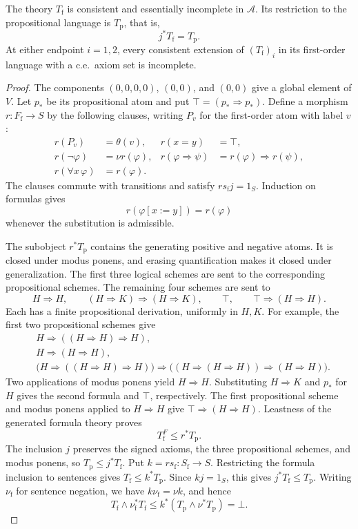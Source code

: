 \begin{proposition}\label{prop:fork-first-order-conservative}
The theory $T_{\mathrm f}$ is consistent and essentially
incomplete in $\mathcal A$. Its restriction to the propositional
language is $T_{\mathrm p}$, that is,
\[
 j^*T_{\mathrm f}=T_{\mathrm p}.
\]
At either endpoint $i=1,2$, every consistent extension of
$(T_{\mathrm f})_i$ in its first-order language with a c.e.\ axiom set
is incomplete.
\end{proposition}
\begin{proof}
The components
$(0,0,0,0)$, $(0,0)$, and $(0,0)$ give a global element of $V$.
Let $p_*$ be its propositional atom and put
$\top=(p_*\Rightarrow p_*)$. Define a morphism
$r:F_{\mathrm f}\to S$ by the following clauses, writing $P_v$
for the first-order atom with label $v$:
\[
\begin{aligned}
 r(P_v)&=\theta(v),& r(x=y)&=\top,\\
 r(\neg\varphi)&=\nu r(\varphi),&
 r(\varphi\Rightarrow\psi)&=r(\varphi)\Rightarrow r(\psi),\\
 r(\forall x\,\varphi)&=r(\varphi).
\end{aligned}
\]
The clauses commute with transitions and satisfy
$r s_{\mathrm f}j=1_S$. Induction on formulas gives
\[
 r(\varphi[x:=y])=r(\varphi)
\]
whenever the substitution is admissible.

The subobject $r^*T_{\mathrm p}$ contains the generating positive
and negative atoms. It is closed under modus ponens, and erasing
quantification makes it closed under generalization. The first
three logical schemes are sent to the corresponding
propositional schemes. The remaining four schemes are sent to
\[
 H\Rightarrow H,\qquad
 (H\Rightarrow K)\Rightarrow(H\Rightarrow K),\qquad
 \top,\qquad
 \top\Rightarrow(H\Rightarrow H).
\]
Each has a finite propositional derivation, uniformly in $H,K$.
For example, the first two propositional schemes give
\[
\begin{aligned}
 &H\Rightarrow((H\Rightarrow H)\Rightarrow H),\\
 &H\Rightarrow(H\Rightarrow H),\\
 &\bigl(H\Rightarrow((H\Rightarrow H)\Rightarrow H)\bigr)
   \Rightarrow
   \bigl((H\Rightarrow(H\Rightarrow H))
                   \Rightarrow(H\Rightarrow H)\bigr).
\end{aligned}
\]
Two applications of modus ponens yield $H\Rightarrow H$.
Substituting $H\Rightarrow K$ and $p_*$ for $H$ gives the second
formula and $\top$, respectively. The first
propositional scheme and modus ponens applied to $H\Rightarrow H$ give
$\top\Rightarrow(H\Rightarrow H)$.
Leastness of the generated formula theory proves
\[
 T_{\mathrm f}^F\le r^*T_{\mathrm p}.
\]
The inclusion $j$ preserves the signed axioms, the three propositional
schemes, and modus ponens, so $T_{\mathrm p}\le j^*T_{\mathrm f}$.
Put $k=r s_{\mathrm f}:S_{\mathrm f}\to S$. Restricting the formula
inclusion to sentences gives $T_{\mathrm f}\le k^*T_{\mathrm p}$.
Since $kj=1_S$, this gives $j^*T_{\mathrm f}\le T_{\mathrm p}$.
Writing $\nu_{\mathrm f}$ for sentence negation, we have
$k\nu_{\mathrm f}=\nu k$, and hence
\[
 T_{\mathrm f}\wedge\nu_{\mathrm f}^*T_{\mathrm f}
 \le k^*(T_{\mathrm p}\wedge\nu^*T_{\mathrm p})=\bot .
\]


\end{proof}
